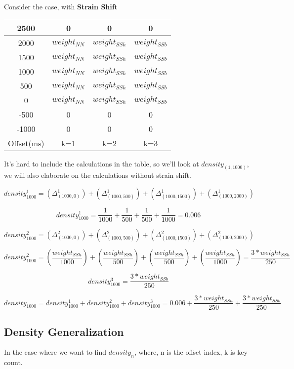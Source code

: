 \documentclass{article}
\begin{document}
Consider the case, with \textbf{Strain Shift}
\begin{center}
	\begin{tabular}{|c|c|c|c|} 
	\hline
	2500 & 0			  & 0 		& 0 	\\ \hline
	2000 & $weight_{NN}$  & $weight_{SSh}$ 	& $weight_{SSb}$\\	\hline
	1500 & $weight_{NN}$  & $weight_{SSh}$ 	& $weight_{SSb}$\\	\hline
	1000 & $weight_{NN}$  & $weight_{SSh}$ 	& $weight_{SSb}$\\	\hline
	 500 & $weight_{NN}$  & $weight_{SSh}$ 	& $weight_{SSb}$\\	\hline
	   0 & $weight_{NN}$  & $weight_{SSh}$ 	& $weight_{SSb}$\\	\hline
    -500 & 0			  & 0 		& 0 	\\	\hline
   -1000 & 0			  & 0 		& 0 	\\
	\hline
	Offset(ms) & k=1 & k=2 & k=3\\ 
	\hline
\end{tabular}
\end{center}

It's hard to include the calculations in the table, so we'll look at $density_{(1,1000)}$, we will also elaborate on the calculations without strain shift.

$$density_{1000}^1 =
(\Delta_{(1000,0)}^{1}) +
(\Delta_{(1000,500)}^{1}) +
(\Delta_{(1000,1500)}^{1}) +
(\Delta_{(1000,2000)}^{1})$$

$$density_{1000}^1 =
\frac{1}{1000} +
\frac{1}{500} +
\frac{1}{500} +
\frac{1}{1000} = 0.006$$

$$density_{1000}^2 = 
(\Delta_{(1000,0)}^{2}) +
(\Delta_{(1000,500)}^{2}) +
(\Delta_{(1000,1500)}^{2}) +
(\Delta_{(1000,2000)}^{2})$$

$$ density_{1000}^2 = 
(\frac{weight_{SSh}}{1000}) +
(\frac{weight_{SSh}}{500}) +
(\frac{weight_{SSh}}{500}) +
(\frac{weight_{SSh}}{1000}) =
\frac{3 * weight_{SSh}}{250} $$

$$ density_{1000}^3 =
\frac{3 * weight_{SSb}}{250} $$

$$ density_{1000} =
density_{1000}^1 + density_{1000}^2 + density_{1000}^3 =
0.006 +
\frac{3 * weight_{SSh}}{250} + \frac{3 * weight_{SSb}}{250} $$

\subsection{Density Generalization}

In the case where we want to find $density_n$, where, n is the offset index, k is key count.
\end{document}
